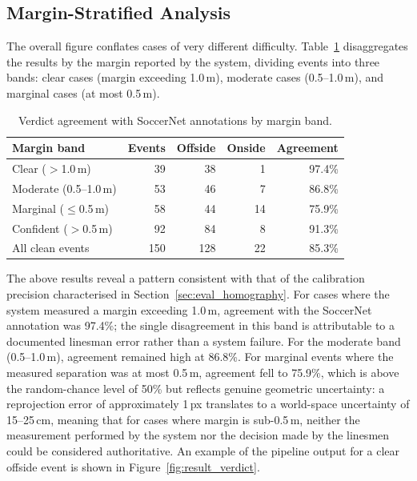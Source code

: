 \subsection{Margin-Stratified Analysis}

The overall figure conflates cases of very different difficulty. Table~\ref{tab:margin_bands} disaggregates the results by the margin reported by the system, dividing events into three bands: clear cases (margin exceeding 1.0\,m), moderate cases (0.5--1.0\,m), and marginal cases (at most 0.5\,m).

\begin{table}[htbp]
  \centering
  \caption{Verdict agreement with SoccerNet annotations by margin band.}
  \label{tab:margin_bands}
  \begin{tabular}{lrrrr}
    \hline
    Margin band & Events & Offside & Onside & Agreement \\
    \hline
    Clear ($>$1.0\,m)      &  39 &  38 &  1 &  97.4\% \\
    Moderate (0.5--1.0\,m) &  53 &  46 &  7 &  86.8\% \\
    Marginal ($\leq$0.5\,m) &  58 &  44 & 14 &  75.9\% \\
    \hline
    Confident ($>$0.5\,m) &  92 &  84 &  8 &  91.3\% \\
    All clean events      & 150 & 128 & 22 &  85.3\% \\
    \hline
  \end{tabular}
\end{table}

The above results reveal a pattern consistent with that of the calibration precision characterised in Section~\ref{sec:eval_homography}. For cases where the system measured a margin exceeding 1.0\,m, agreement with the SoccerNet annotation was 97.4\%; the single disagreement in this band is attributable to a documented linesman error rather than a system failure. For the moderate band (0.5--1.0\,m), agreement remained high at 86.8\%. For marginal events where the measured separation was at most 0.5\,m, agreement fell to 75.9\%, which is above the random-chance level of 50\% but reflects genuine geometric uncertainty: a reprojection error of approximately 1\,px translates to a world-space uncertainty of 15--25\,cm, meaning that for cases where margin is sub-0.5\,m, neither the measurement performed by the system nor the decision made by the linesmen could be considered authoritative. An example of the pipeline output for a clear offside event is shown in Figure~\ref{fig:result_verdict}.

